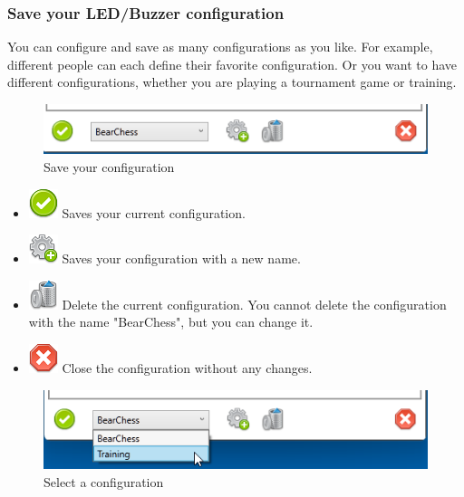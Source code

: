 \documentclass[11pt,a4paper]{article}
\begin{document}
\subsubsection{Save your LED/Buzzer configuration}
You can configure and save as many configurations as you like. For example, different people can each define their favorite configuration. Or you want to have different configurations, whether you are playing a tournament game or training.

\begin{figure}[H]
	\centering
	\includegraphics[scale=1.0]{iChessOne7.png}
	\caption{Save your configuration}
	\label{fig:iChessOne10}
\end{figure}

\begin{itemize}
	\item \includegraphics[scale=0.3]{accept_button.png} Saves your current configuration.
    \item \includegraphics[scale=0.3]{cog_add.png} Saves your configuration with a new name.
    \item \includegraphics[scale=0.3]{bin.png} Delete the current configuration. You cannot delete the configuration with the name "BearChess", but you can change it.
    \item \includegraphics[scale=0.3]{cancel.png} Close the configuration without any changes.
\end{itemize}


\begin{figure}[H]
	\centering
	\includegraphics[scale=1.0]{iChessOne8.png}
	\caption{Select a configuration}
	\label{fig:iChessOne11}
\end{figure}
\end{document}
